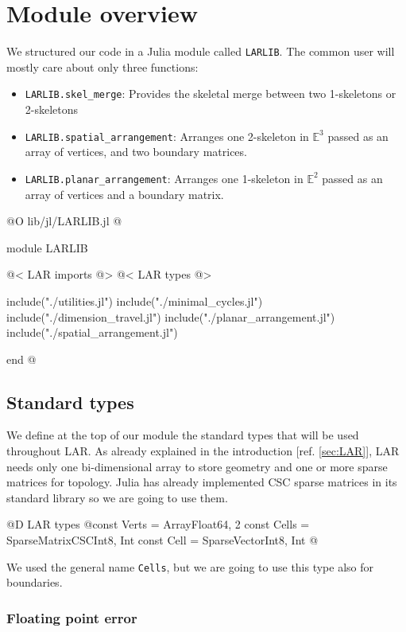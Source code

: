 \chapter{Module overview}

We structured our code in a Julia module called \texttt{LARLIB}.
The common user will mostly care about only three functions:
\begin{itemize}[noitemsep]
    \item \texttt{LARLIB.skel\_merge}: Provides the skeletal merge between two
        1-skeletons or 2-skeletons
    \item \texttt{LARLIB.spatial\_arrangement}: Arranges one 2-skeleton 
        in $\mathbb{E}^3$ passed as an array of vertices, and two boundary matrices.
    \item \texttt{LARLIB.planar\_arrangement}: Arranges one 1-skeleton 
        in $\mathbb{E}^2$ passed as an array of vertices and a boundary matrix.
\end{itemize}


@O lib/jl/LARLIB.jl
@{module LARLIB

    @< LAR imports @>
    @< LAR types @>

    include("./utilities.jl")
    include("./minimal_cycles.jl")
    include("./dimension_travel.jl")
    include("./planar_arrangement.jl")
    include("./spatial_arrangement.jl")
    
end
@}

\section{Standard types}

We define at the top of our module the standard types
that will be used throughout LAR. As already explained
in the introduction [ref. \ref{sec:LAR}], LAR needs
only one bi-dimensional array to store geometry and 
one or more sparse matrices for topology.
Julia has already implemented CSC sparse matrices in
its standard library so we are going to use them.

@D LAR types
@{const Verts = Array{Float64, 2}
const Cells = SparseMatrixCSC{Int8, Int}
const Cell = SparseVector{Int8, Int}
@}

We used the general name \texttt{Cells}, but
we are going to use this type also for boundaries.

\subsection{Floating point error}
\label{sec:floating-point_error}

